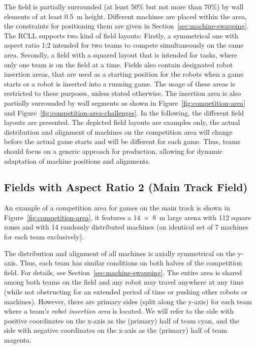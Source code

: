 \documentclass[12pt,twoside]{article}
\newcommand{\refsec}[1]{Section~\ref{#1}}
\newcommand{\reffig}[1]{Figure~\ref{#1}}
\begin{document}
The field is partially surrounded (at least 50\% but not more than 70\%)
by wall elements of at least \SI{0.5}{\metre} height.
Different machines are placed within the area, the constraints for
positioning them are given in \refsec{sec:machine-swapping}.
The \ac{RCLL} supports two kind of field layouts:
Firstly, a symmetrical one
with aspect ratio 1:2 intended for two teams to compete simultaneously
on the same area.
Secondly, a field with a squared layout that is intended for tasks,
where only one team is on the field at a time.
Fields also contain designated robot insertion areas, that are used as a
starting position for the robots when a game starts or a robot is inserted
into a running game. The usage of these areas is restricted to these purposes,
unless stated otherwise. The insertion area is also partially surrounded by
wall segments as shown in \reffig{fig:competition-area} and
\reffig{fig:competition-area-challenges}.
In the following, the different field layouts are presented.
The depicted field layouts are examples only, the actual
distribution and alignment of machines on the competition area will change
before the actual game starts and will be different for each game. Thus, teams
should focus on a generic approach for production, allowing for
dynamic adaptation of machine positions and alignments.

\subsection{Fields with Aspect Ratio 2 (Main Track Field)}
\label{sec:competition-area}
An example of a competition area for games on the main track is shown in
\reffig{fig:competition-area}, it
features a \SI{14 x 8}{\metre} large arena with 112 square zones %
and with 14 randomly distributed machines (an identical set of 7 machines for
each team exclusively). %

The distribution and alignment of all machines is axially symmetrical
on the y-axis. Thus, each team has similar conditions on both halves of
the competition field.
For details, see \refsec{sec:machine-swapping}.
The entire area is shared among both teams on the field and any robot may travel
anywhere at any time (while not obstructing for an extended period of
time or pushing other robots or machines).
However, there are primary sides (split along the y-axis) for each team where
a team's \textit{robot insertion area} is located.
We will refer to the side with positive coordinates on the x-axis as the
(primary) half of team cyan, and the side with negative coordinates on the
x-axis as the (primary) half of team magenta.
\end{document}
